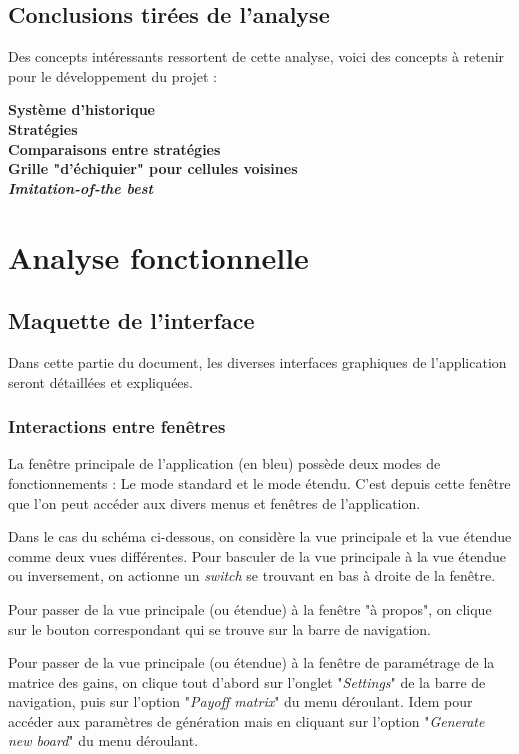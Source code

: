 \documentclass[a4paper, french]{article}
\begin{document}
\subsection{Conclusions tirées de l'analyse}
Des concepts intéressants ressortent de cette analyse, voici des concepts à retenir pour le développement du projet :

\textbf{Système d'historique}\\
\textbf{Stratégies}\\
\textbf{Comparaisons entre stratégies}\\
\textbf{Grille "d'échiquier" pour cellules voisines}\\
\textbf{\textit{Imitation-of-the best}}

\pagebreak
\section{Analyse fonctionnelle}
\subsection{Maquette de l'interface}
Dans cette partie du document, les diverses interfaces graphiques de l'application seront détaillées et expliquées.

\subsubsection{Interactions entre fenêtres}
La fenêtre principale de l'application (en bleu) possède deux modes de fonctionnements : Le mode standard et le mode étendu. C'est depuis cette fenêtre que l'on peut accéder aux divers menus et fenêtres de l'application.

Dans le cas du schéma ci-dessous, on considère la vue principale et la vue étendue comme deux vues différentes. Pour basculer de la vue principale à la vue étendue ou inversement, on actionne un \textit{switch} se trouvant en bas à droite de la fenêtre.

Pour passer de la vue principale (ou étendue) à la fenêtre "à propos", on clique sur le bouton correspondant qui se trouve sur la barre de navigation.

Pour passer de la vue principale (ou étendue) à la fenêtre de paramétrage de la matrice des gains, on clique tout d'abord sur l'onglet "\textit{Settings}" de la barre de navigation, puis sur l'option "\textit{Payoff matrix}" du menu déroulant. Idem pour accéder aux paramètres de génération mais en cliquant sur l'option "\textit{Generate new board}" du menu déroulant.
\end{document}
